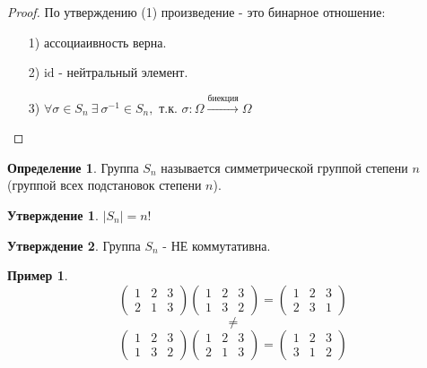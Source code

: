 \documentclass[a4paper, 12pt]{article}
\theoremstyle{definition}
\newtheorem*{definition}{Определение}
\newtheorem*{subtheorem}{Утверждение}
\newtheorem*{example1}{Пример}
\begin{document}
  \begin{proof}
    По утверждению (1) произведение - это бинарное отношение:
    \begin{itemize}
      \item[1)] ассоциаивность верна.
      \item[2)] $\textrm{id}$ - нейтральный элемент.
      \item[3)] $\forall \sigma \in S_n \ \exists \ \sigma^{-1} \in S_n, $ т.к. $\sigma: \Omega \overset{\text{биекция}}{\longrightarrow} \Omega$  
    \end{itemize}
  \end{proof} 
  \begin{definition}
    Группа $S_n$ называется симметрической группой степени $n$ \\(группой всех подстановок степени $n$).
  \end{definition} 
  \begin{subtheorem}
    $|S_n| = n!$ 
  \end{subtheorem} 
  \begin{subtheorem}
    Группа $S_n$ - НЕ коммутативна.
  \end{subtheorem} 
  \begin{example1}
    $$\begin{pmatrix}
      1 & 2 & 3 \\ 2 & 1 & 3
    \end{pmatrix} \begin{pmatrix}
      1 & 2 & 3 \\ 1 & 3 & 2
    \end{pmatrix} = \begin{pmatrix}
      1 & 2 & 3 \\ 2 & 3 & 1
    \end{pmatrix}$$ 
    $$\neq$$ 
    $$\begin{pmatrix}
      1 & 2 & 3 \\ 1 & 3 & 2
    \end{pmatrix} \begin{pmatrix}
      1 & 2 & 3 \\ 2 & 1 & 3
    \end{pmatrix} = \begin{pmatrix}
      1 & 2 & 3 \\ 3 & 1 & 2
    \end{pmatrix}$$ 
  \end{example1}
\end{document}
